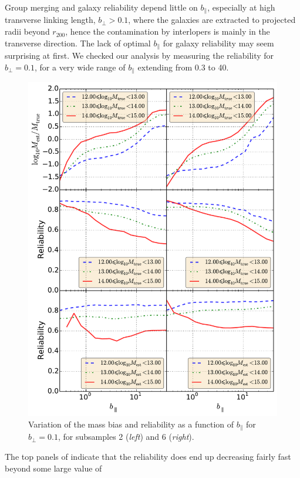 Group merging and galaxy reliability depend little on $b_\parallel$, especially
at high transverse linking length, $b_\perp > 0.1$, where the galaxies are
extracted to projected radii beyond $r_{200}$, hence the contamination by
interlopers is mainly in the transverse direction. The lack of optimal
$b_\parallel$ for galaxy reliability may seem surprising at first. We checked
our analysis by measuring the reliability for $b_\perp=0.1$, for a very wide
range of $b_\parallel$ extending from 0.3 to 40.
%
\begin{figure}
    \includegraphics[width=0.3\textheight]{figures/fof/parallel_link_behaviour.pdf}
    \caption{Variation of the mass bias and reliability as a function of
    $b_\parallel$ for $b_\bot =0.1$, for subsamples 2 (\emph{left}) and 6
(\emph{right}).\label{fig:parallel_behaviour}}
\end{figure}
%
The top panels of  indicate that the
reliability does end up decreasing fairly fast beyond some large value of
